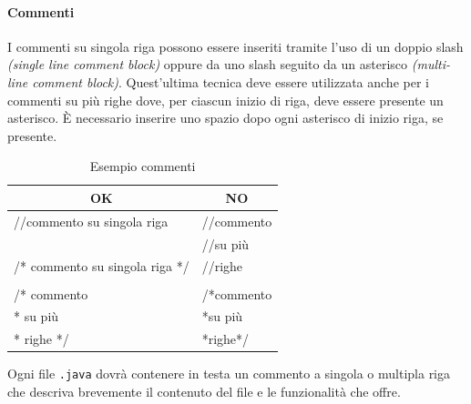 \paragraph{Commenti}I commenti su singola riga possono essere inseriti tramite l’uso di un doppio slash \emph{(single line comment block)} oppure da uno slash seguito da un asterisco \emph{(multi-line comment block)}. Quest’ultima tecnica deve essere utilizzata anche per i commenti su più righe dove, per ciascun inizio di riga, deve essere presente un asterisco. È necessario inserire uno spazio dopo ogni asterisco di inizio riga, se presente.
\begin{table} [H]
	\begin{center}
		\begin{tabular}{ | l | l |}
			\multicolumn{1}{c}{\textbf{OK}}&\multicolumn{1}{c}{\textbf{NO}}\\ 
			\hline
			//commento su singola riga & //commento\\
			& //su più\\
			/* commento su singola riga */& //righe\\
			&\\
			/* commento&/*commento\\
			\hspace{0.2cm}* su più&\hspace{0.2cm}*su più\\
			\hspace{0.2cm}* righe */&\hspace{0.2cm}*righe*/\\
			\hline
		\end{tabular}
	\end{center}
	\caption{Esempio commenti}
\end{table}
Ogni file \texttt{.java} dovrà contenere in testa un commento a singola o multipla riga che descriva brevemente il contenuto del file e le funzionalità che offre.
